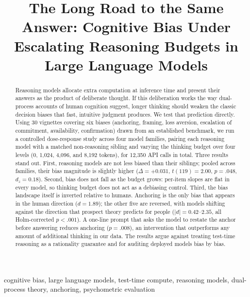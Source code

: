 \documentclass[conference]{IEEEtran}
\begin{document}
\title{The Long Road to the Same Answer: Cognitive Bias Under Escalating Reasoning Budgets in Large Language Models}

\author{
}

\maketitle

\begin{abstract}
Reasoning models allocate extra computation at inference time and present their answers as the product of deliberate thought. If this deliberation works the way dual-process accounts of human cognition suggest, longer thinking should weaken the classic decision biases that fast, intuitive judgment produces. We test that prediction directly. Using 30 vignettes covering six biases (anchoring, framing, loss aversion, escalation of commitment, availability, confirmation) drawn from an established benchmark, we run a controlled dose-response study across four model families, pairing each reasoning model with a matched non-reasoning sibling and varying the thinking budget over four levels (0, 1,024, 4,096, and 8,192 tokens), for 12,350 API calls in total. Three results stand out. First, reasoning models are not less biased than their siblings; pooled across families, their bias magnitude is slightly higher ($\Delta = +0.031$, $t(119) = 2.00$, $p = .048$, $d_z = 0.18$). Second, bias does not fall as the budget grows: per-item slopes are flat in every model, so thinking budget does not act as a debiasing control. Third, the bias landscape itself is inverted relative to humans. Anchoring is the only bias that appears in the human direction ($d = 1.89$); the other five are reversed, with models shifting against the direction that prospect theory predicts for people ($|d| = 0.42$--$2.35$, all Holm-corrected $p < .001$). A one-line prompt that asks the model to restate the anchor before answering reduces anchoring ($p = .008$), an intervention that outperforms any amount of additional thinking in our data. The results argue against treating test-time reasoning as a rationality guarantee and for auditing deployed models bias by bias.
\end{abstract}

\begin{IEEEkeywords}
cognitive bias, large language models, test-time compute, reasoning models, dual-process theory, anchoring, psychometric evaluation
\end{IEEEkeywords}
\end{document}
